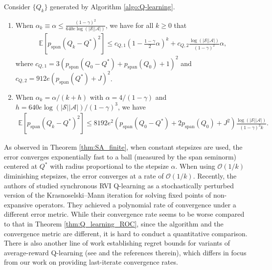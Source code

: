 \documentclass[11 pt]{article}
\begin{document}
	\begin{theorem}\label{thm:Q_learning_ROC}
		Consider $\{Q_k\}$ generated by Algorithm \ref{algo:Q-learning}. 
		\begin{enumerate}[(1)]
			\item When $\alpha_k \equiv \alpha \leq \frac{(1 - \gamma)^2}{640e\log\left(|\mathcal{S}| |\mathcal{A}|\right)}$, we have for all $k\geq 0$ that
			\begin{equation*}
				\begin{split}
					\mathbb{E}[p_{\text{span}}(Q_{k}-Q^*)^2] \leq c_{Q,1} \left(1 -  \frac{1-\gamma}{2}\alpha\right)^{k} + c_{Q,2}\frac{\log\left(|\mathcal{S}| |\mathcal{A}|\right)}{(1-\gamma)^2} \alpha,
				\end{split}
			\end{equation*}
			where $c_{Q,1} = 3(p_{\text{span}}(Q_0-Q^*)+p_{\text{span}}(Q_0)+1)^2$ and $c_{Q,2} = 912e(p_{\text{span}}(Q^*)+ J)^2$.
			\item When $\alpha_k =\alpha/(k + h)$ with $\alpha = 4/(1-\gamma)$ and $h = 640e\log\left(|\mathcal{S}| |\mathcal{A}|\right)/(1 - \gamma)^3$, we have
			\begin{equation*}
				\begin{split}
					\mathbb{E}[p_{\text{span}}(Q_{k}-Q^*)^2] \leq 8192e^2\left(p_{\text{span}}(Q_0-Q^*)+2p_{\text{span}}(Q_0)+J^2\right)\frac{\log\left(|\mathcal{S}| |\mathcal{A}|\right)}{(1-\gamma)^3 k}.
				\end{split}
			\end{equation*}
		\end{enumerate}
		
	\end{theorem}
	
	As observed in Theorem \ref{thm:SA_finite}, when constant stepsizes are used, the error converges exponentially fast to a ball (measured by the span seminorm) centered at $Q^*$ with radius proportional to the stepsize $\alpha$. When using $\mathcal{O}(1/k)$ diminishing stepsizes, the error converges at a rate of $\mathcal{O}(1/k)$. Recently, the authors of \cite{bravo2024stochastic} studied synchronous RVI Q-learning as a stochastically perturbed version of the Krasnoselski–Mann iteration for solving fixed points of non-expansive operators. They achieved a polynomial rate of convergence under a different error metric. While their convergence rate seems to be worse compared to that in Theorem \ref{thm:Q_learning_ROC}, since the algorithm and the convergence metric are different, it is hard to conduct a quantitative comparison. There is also another line of work establishing regret bounds for variants of average-reward Q-learning (see \cite{agrawal2024optimistic} and the references therein), which differs in focus from our work on providing last-iterate convergence rates.
	
\end{document}
